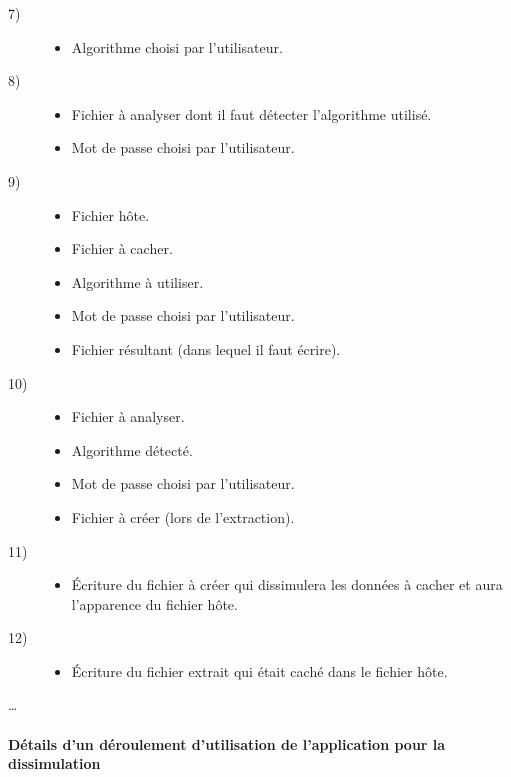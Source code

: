 \documentclass[11pt]{article}
\begin{document}
\begin{multicols}{2}
\begin{description}
\begin{itemize}
\end{itemize}
\item[7)] %
\begin{itemize}
\item Algorithme choisi par l'utilisateur. 
\end{itemize}
\item[8)] %
\begin{itemize}
\item Fichier à analyser dont il faut détecter l'algorithme utilisé. 
\item Mot de passe choisi par l'utilisateur. 
\end{itemize}
\item[9)] %
\begin{itemize}
\item Fichier hôte. 
\item Fichier à cacher. 
\item Algorithme à utiliser. 
\item Mot de passe choisi par l'utilisateur. 
\item Fichier résultant (dans lequel il faut écrire). 
\end{itemize}
\item[10)] %
\begin{itemize}
\item Fichier à analyser.
\item Algorithme détecté. 
\item Mot de passe choisi par l'utilisateur. 
\item Fichier à créer (lors de l'extraction). 
\end{itemize}
\item[11)] 
\begin{itemize}
\item Écriture du fichier à créer qui dissimulera les données à cacher et aura
    l'apparence du fichier hôte.
\end{itemize}
\item[12)]
\begin{itemize}
\item Écriture du fichier extrait qui était caché dans le fichier hôte.
\end{itemize}
\end{description}
  \ldots
\end{multicols}

\paragraph{Détails d'un déroulement d'utilisation de l'application pour la 
dissimulation}
\end{document}
